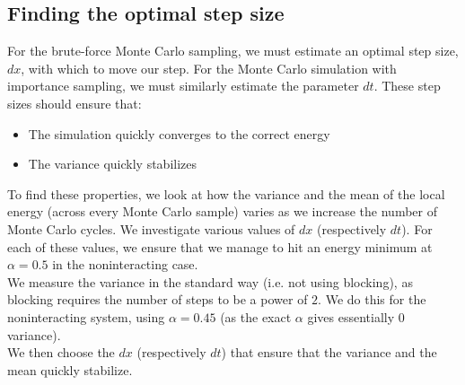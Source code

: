 \documentclass[a4paper, 10pt]{article}
\begin{document}
	\subsection{Finding the optimal step size}\label{sec:finding_optimal_step_size}
	For the brute-force Monte Carlo sampling, we must estimate an optimal step size, $d x$, with which to move our step. For the Monte Carlo simulation with importance sampling, we must similarly estimate the parameter $d t$. These step sizes should ensure that:
	\begin{itemize}
		\item The simulation quickly converges to the correct energy
		\item The variance quickly stabilizes
	\end{itemize}
	To find these properties, we look at how the variance and the mean of the local energy (across every Monte Carlo sample) varies as we increase the number of Monte Carlo cycles. We investigate various values of $dx$ (respectively $dt$). For each of these values, we ensure that we manage to hit an energy minimum at $\alpha=0.5$ in the noninteracting case.\\
	\linebreak
	We measure the variance in the standard way (i.e. not using blocking), as blocking requires the number of steps to be a power of $2$. We do this for the noninteracting system, using $\alpha=0.45$ (as the exact $\alpha$ gives essentially $0$ variance). \\
	\linebreak
	We then choose the $dx$ (respectively $dt$) that ensure that the variance and the mean quickly stabilize.
\end{document}
